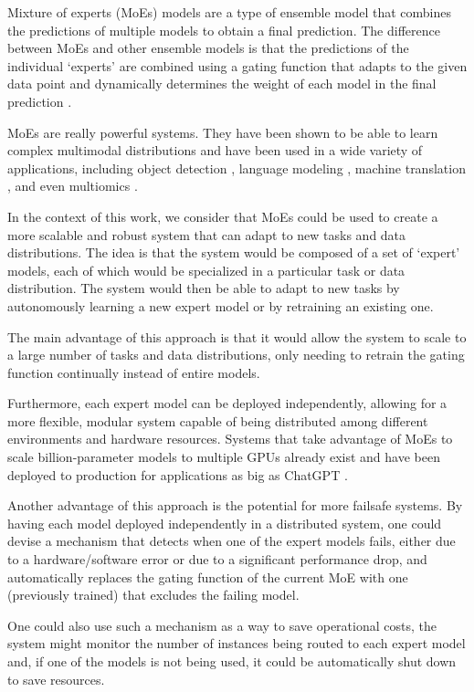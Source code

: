 \documentclass[../main.tex]{subfiles}
\begin{document}
    Mixture of experts (MoEs) models are a type of ensemble model that combines the predictions of multiple models to obtain a final prediction. The difference between MoEs and other ensemble models is that the predictions of the individual `experts' are combined using a gating function that adapts to the given data point and dynamically determines the weight of each model in the final prediction \cite{chen_towards_2022}.

    MoEs are really powerful systems. They have been shown to be able to learn complex multimodal distributions and have been used in a wide variety of applications, including object detection \cite{hwang_tutel_2023}, language modeling \cite{mustafa_multimodal_2022}, machine translation \cite{shazeer_outrageously_2017}, and even multiomics \cite{minoura_scmm_2021}.
    
    In the context of this work, we consider that MoEs could be used to create a more scalable and robust system that can adapt to new tasks and data distributions. The idea is that the system would be composed of a set of `expert' models, each of which would be specialized in a particular task or data distribution. The system would then be able to adapt to new tasks by autonomously learning a new expert model or by retraining an existing one.
    
    The main advantage of this approach is that it would allow the system to scale to a large number of tasks and data distributions, only needing to retrain the gating function continually instead of entire models. 
    
    Furthermore, each expert model can be deployed independently, allowing for a more flexible, modular system capable of being distributed among different environments and hardware resources. Systems that take advantage of MoEs to scale billion-parameter models to multiple GPUs already exist and have been deployed to production for applications as big as ChatGPT .
    
    Another advantage of this approach is the potential for more failsafe systems. By having each model deployed independently in a distributed system, one could devise a mechanism that detects when one of the expert models fails, either due to a hardware/software error or due to a significant performance drop, and automatically replaces the gating function of the current MoE with one (previously trained) that excludes the failing model.
    
    One could also use such a mechanism as a way to save operational costs, the system might monitor the number of instances being routed to each expert model and, if one of the models is not being used, it could be automatically shut down to save resources.
    
\end{document}
